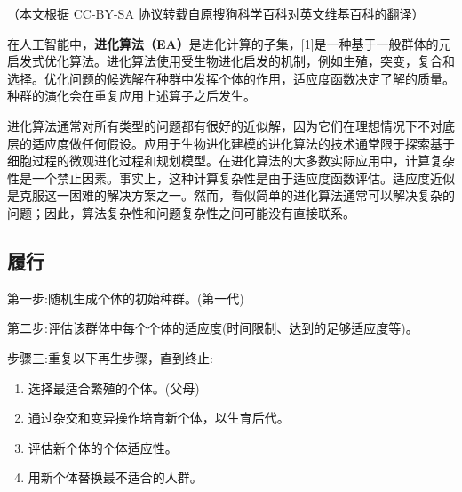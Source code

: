 
（本文根据 CC-BY-SA 协议转载自原搜狗科学百科对英文维基百科的翻译）

在人工智能中，\textbf{进化算法（EA）}是进化计算的子集，[1]是一种基于一般群体的元启发式优化算法。进化算法使用受生物进化启发的机制，例如生殖，突变，复合和选择。优化问题的候选解在种群中发挥个体的作用，适应度函数决定了解的质量。种群的演化会在重复应用上述算子之后发生。

进化算法通常对所有类型的问题都有很好的近似解，因为它们在理想情况下不对底层的适应度做任何假设。应用于生物进化建模的进化算法的技术通常限于探索基于细胞过程的微观进化过程和规划模型。在进化算法的大多数实际应用中，计算复杂性是一个禁止因素。事实上，这种计算复杂性是由于适应度函数评估。适应度近似是克服这一困难的解决方案之一。然而，看似简单的进化算法通常可以解决复杂的问题；因此，算法复杂性和问题复杂性之间可能没有直接联系。

\subsection{履行}
第一步:随机生成个体的初始种群。(第一代)

第二步:评估该群体中每个个体的适应度(时间限制、达到的足够适应度等)。

步骤三:重复以下再生步骤，直到终止:
\begin{enumerate}
\item 选择最适合繁殖的个体。(父母)
\item 通过杂交和变异操作培育新个体，以生育后代。
\item 评估新个体的个体适应性。
\item 用新个体替换最不适合的人群。
\end{enumerate}

